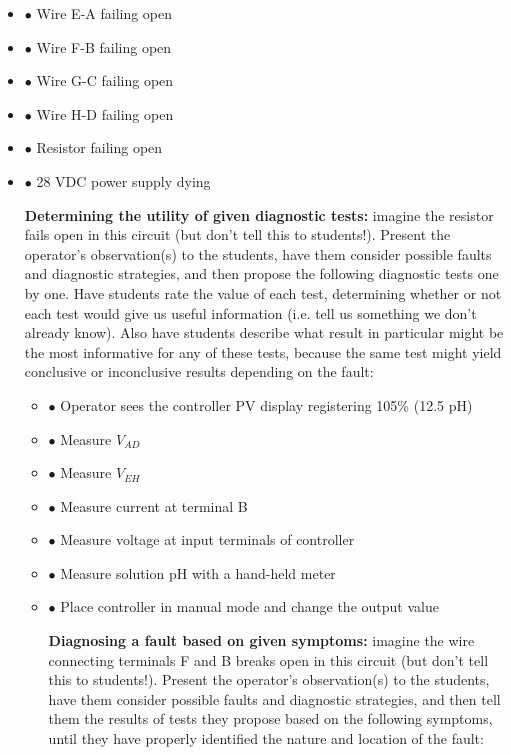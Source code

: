 \begin{itemize}
\item{$\bullet$} Wire E-A failing open
\item{$\bullet$} Wire F-B failing open
\item{$\bullet$} Wire G-C failing open
\item{$\bullet$} Wire H-D failing open
\item{$\bullet$} Resistor failing open
\item{$\bullet$} 28 VDC power supply dying
\medskip


\vskip 10pt


\noindent
{\bf Determining the utility of given diagnostic tests:} imagine the resistor fails open in this circuit (but don't tell this to students!).  Present the operator's observation(s) to the students, have them consider possible faults and diagnostic strategies, and then propose the following diagnostic tests one by one.  Have students rate the value of each test, determining whether or not each test would give us useful information (i.e. tell us something we don't already know).  Also have students describe what result in particular might be the most informative for any of these tests, because the same test might yield conclusive or inconclusive results depending on the fault:

\begin{itemize}
\item{$\bullet$} Operator sees the controller PV display registering 105\% (12.5 pH)
\item{$\bullet$} Measure $V_{AD}$
\item{$\bullet$} Measure $V_{EH}$
\item{$\bullet$} Measure current at terminal B
\item{$\bullet$} Measure voltage at input terminals of controller
\item{$\bullet$} Measure solution pH with a hand-held meter
\item{$\bullet$} Place controller in manual mode and change the output value
\medskip


\vskip 10pt


\noindent
{\bf Diagnosing a fault based on given symptoms:} imagine the wire connecting terminals F and B breaks open in this circuit (but don't tell this to students!).  Present the operator's observation(s) to the students, have them consider possible faults and diagnostic strategies, and then tell them the results of tests they propose based on the following symptoms, until they have properly identified the nature and location of the fault:


\end{itemize}
\end{itemize}
